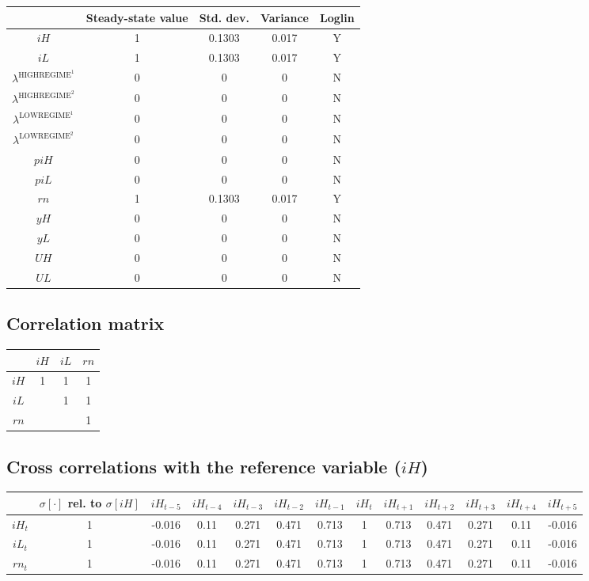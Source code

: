 \begin{tabular}{c|c|c|c|c|}
  & Steady-state value & Std. dev. & Variance & Loglin\\
\hline
${i\!H}$ & 1 & 0.1303 & 0.017 & Y    \\
${i\!L}$ & 1 & 0.1303 & 0.017 & Y    \\
$\lambda^{\mathrm{HIGHREGIME}^{\mathrm{1}}}$ & 0 & 0 & 0 & N    \\
$\lambda^{\mathrm{HIGHREGIME}^{\mathrm{2}}}$ & 0 & 0 & 0 & N    \\
$\lambda^{\mathrm{LOWREGIME}^{\mathrm{1}}}$ & 0 & 0 & 0 & N    \\
$\lambda^{\mathrm{LOWREGIME}^{\mathrm{2}}}$ & 0 & 0 & 0 & N    \\
${p\!i\!H}$ & 0 & 0 & 0 & N    \\
${p\!i\!L}$ & 0 & 0 & 0 & N    \\
${r\!n}$ & 1 & 0.1303 & 0.017 & Y    \\
${y\!H}$ & 0 & 0 & 0 & N    \\
${y\!L}$ & 0 & 0 & 0 & N    \\
${U\!H}$ & 0 & 0 & 0 & N    \\
${U\!L}$ & 0 & 0 & 0 & N    \\
\hline
\end{tabular}


\subsection{Correlation matrix}

\begin{tabular}{c|ccc|}
  & ${i\!H}$ & ${i\!L}$ & ${r\!n}$\\
\hline
${i\!H}$ & 1 & 1 & 1 \\
${i\!L}$ &  & 1 & 1 \\
${r\!n}$ &  &  & 1 \\
\hline
\end{tabular}


\subsection{Cross correlations with the reference variable (${i\!H}$)}

\begin{tabular}{c|c|c|c|c|c|c|c|c|c|c|c|c|}
  & $\sigma[\cdot]$ rel. to $\sigma[{i\!H}]$ & ${i\!H}_{t-5}$ & ${i\!H}_{t-4}$ & ${i\!H}_{t-3}$ & ${i\!H}_{t-2}$ & ${i\!H}_{t-1}$ & ${i\!H}_{t}$ & ${i\!H}_{t+1}$ & ${i\!H}_{t+2}$ & ${i\!H}_{t+3}$ & ${i\!H}_{t+4}$ & ${i\!H}_{t+5}$\\
\hline
${i\!H}_{t}$ & 1 & -0.016 & 0.11 & 0.271 & 0.471 & 0.713 & 1 & 0.713 & 0.471 & 0.271 & 0.11 & -0.016 \\
${i\!L}_{t}$ & 1 & -0.016 & 0.11 & 0.271 & 0.471 & 0.713 & 1 & 0.713 & 0.471 & 0.271 & 0.11 & -0.016 \\
${r\!n}_{t}$ & 1 & -0.016 & 0.11 & 0.271 & 0.471 & 0.713 & 1 & 0.713 & 0.471 & 0.271 & 0.11 & -0.016 \\
\hline
\end{tabular}


